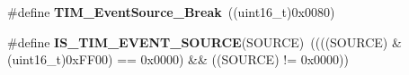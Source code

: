 \begin{DoxyCompactItemize}
\item 
\hypertarget{group__TIM__Event__Source_gad6f9b5366d93c73ff005273c50c9f00a}{
\#define {\bfseries TIM\_\-EventSource\_\-Break}~((uint16\_\-t)0x0080)}
\label{group__TIM__Event__Source_gad6f9b5366d93c73ff005273c50c9f00a}

\item 
\hypertarget{group__TIM__Event__Source_ga4ac88c3e43c8250114ea81a6e052d58a}{
\#define {\bfseries IS\_\-TIM\_\-EVENT\_\-SOURCE}(SOURCE)~((((SOURCE) \& (uint16\_\-t)0xFF00) == 0x0000) \&\& ((SOURCE) != 0x0000))}
\label{group__TIM__Event__Source_ga4ac88c3e43c8250114ea81a6e052d58a}

\end{DoxyCompactItemize}
